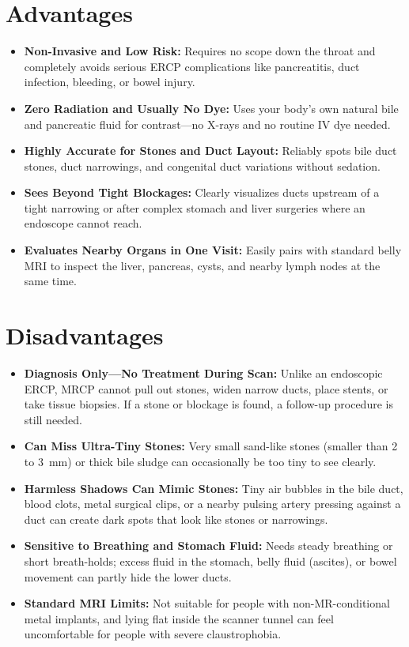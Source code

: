 \section{Advantages}
\begin{itemize}
\item \textbf{Non-Invasive and Low Risk:} Requires no scope down the throat and completely avoids serious ERCP complications like pancreatitis, duct infection, bleeding, or bowel injury.
\item \textbf{Zero Radiation and Usually No Dye:} Uses your body's own natural bile and pancreatic fluid for contrast---no X-rays and no routine IV dye needed.
\item \textbf{Highly Accurate for Stones and Duct Layout:} Reliably spots bile duct stones, duct narrowings, and congenital duct variations without sedation.
\item \textbf{Sees Beyond Tight Blockages:} Clearly visualizes ducts upstream of a tight narrowing or after complex stomach and liver surgeries where an endoscope cannot reach.
\item \textbf{Evaluates Nearby Organs in One Visit:} Easily pairs with standard belly MRI to inspect the liver, pancreas, cysts, and nearby lymph nodes at the same time.
\end{itemize}

\section{Disadvantages}
\begin{itemize}
\item \textbf{Diagnosis Only---No Treatment During Scan:} Unlike an endoscopic ERCP, MRCP cannot pull out stones, widen narrow ducts, place stents, or take tissue biopsies. If a stone or blockage is found, a follow-up procedure is still needed.
\item \textbf{Can Miss Ultra-Tiny Stones:} Very small sand-like stones (smaller than 2 to 3~mm) or thick bile sludge can occasionally be too tiny to see clearly.
\item \textbf{Harmless Shadows Can Mimic Stones:} Tiny air bubbles in the bile duct, blood clots, metal surgical clips, or a nearby pulsing artery pressing against a duct can create dark spots that look like stones or narrowings.
\item \textbf{Sensitive to Breathing and Stomach Fluid:} Needs steady breathing or short breath-holds; excess fluid in the stomach, belly fluid (ascites), or bowel movement can partly hide the lower ducts.
\item \textbf{Standard MRI Limits:} Not suitable for people with non-MR-conditional metal implants, and lying flat inside the scanner tunnel can feel uncomfortable for people with severe claustrophobia.
\end{itemize}


